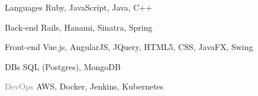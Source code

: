 

\begin{cvskills}


  \cvskill
    {Languages} %
    {Ruby, JavaScript, Java, C++} %

  \cvskill
    {Back-end} %
    {Rails, Hanami, Sinatra, Spring} %

  \cvskill
    {Front-end} %
    {Vue.js, AngularJS, JQuery, HTML5, CSS, JavaFX, Swing} %
	
	  
  \cvskill
    {DBs} %
    {SQL (Postgres), MongoDB} %


  \cvskill
    {\textcolor{gray}{DevOps}} %
    {AWS, Docker, Jenkins, Kubernetes} %

\end{cvskills}
